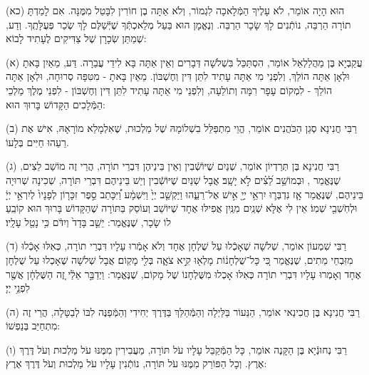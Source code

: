 \documentclass[twoside, openany, parskip=half, 11pt]{book}
\begin{document}
(כא) הוּא הָיָה אוֹמֵר, לֹא עָלֶיךָ הַמְּֿלָאכָה לִגְמוֹר, וְלֹא אַתָּה בֶן חוֹרִין לִבָּטֵל מִמֶּנָּה. אִם לָמַדְתָּ תוֹרָה הַרְבֵּה, נוֹתְֿנִים לָךְ שָׂכָר הַרְבֵּה. וְנֶאֱמָן הוּא בַּעַל מְלַאכְתְּֿךָ שֶׁיְּֿשַׁלֶּם לָךְ שְׂכַר פְּעֻלָּתֶֽךָ. וְדַע, שֶׁמַתַּן שְׂכָרָן שֶׁל צַדִּיקִים לֶעָתִיד לָבוֹא:


\kolyisroel

(א)
עֲקַבְיָא בֶּן מַהֲלַלְאֵל אוֹמֵר, הִסְתַּכֵּל בִּשְׁלֹשָׁה דְּבָרִים וְאֵין אַתָּה בָּא לִידֵי עֲבֵרָה. דַּע, מֵאַיִן בָּאתָ וּלְאָן אַתָּה הוֹלֵךְ, וְלִפְנֵי מִי אַתָּה עָתִיד לִתֵּן דִּין וְחֶשְׁבּוֹן.
מֵאַיִן בָּאתָ - מִטִּפָּה סְרוּחָה,
וּלְאָן אַתָּה הוֹלֵךְ - לִמְקוֹם עָפָר רִמָּה וְתוֹלֵעָה,
וְלִפְנֵי מִי אַתָּה עָתִיד לִתֵּן דִּין וְחֶשְׁבּוֹן - לִפְנֵי מֶלֶךְ מַלְכֵי הַמְּֿלָכִים הַקָּדוֹשׁ בָּרוּךְ הוּא:

(ב)
רַבִּי חֲנִינָא סְגַן הַכֹּהֲנִים אוֹמֵר, הֱוֵי מִתְפַּלֵּל בִשְׁלוֹמָהּ שֶׁל מַלְכוּת, שֶׁאִלְמָלֵא מוֹרָאָהּ, אִישׁ אֶת רֵעֵהוּ חַיִּים בְּלָעוֹ.

(ג)
רַבִּי חֲנִינָא בֶּן תְּרַדְיוֹן אוֹמֵר, שְׁנַיִם שֶׁיּוֹשְֿׁבִין וְאֵין בֵּינֵיהֶן דִּבְרֵי תוֹרָה, הֲרֵי זֶה מוֹשַׁב לֵצִים, שֶׁנֶּאֱמַר 
, וּבְמוֹשַׁ֥ב לֵ֝צִ֗ים לֹ֣א יָשָֽׁב׃
אֲבָל שְׁנַיִם שֶׁיּוֹשְֿׁבִין וְיֵשׁ בֵּינֵיהֶם דִּבְרֵי תּוֹרָה, שְׁכִינָה שְׁרוּיָה בֵּינֵיהֶם, שֶׁנֶּאֱמַר 
אָ֧ז נִדְבְּר֛וּ יִרְאֵ֥י יְיָ֖ אִ֣ישׁ אֶל־רֵעֵ֑הוּ וַיַּקְשֵׁ֤ב יְיָ֙ וַיִּשְׁמָ֔ע וַ֠יִּכָּתֵב סֵ֣פֶר זִכָּר֤וֹן לְפָנָיו֙ לְיִרְאֵ֣י יְיָ֔ וּלְחֹֽשְׁבֵ֖י שְׁמֽוֹ׃ אֵין לִי אֶלָּא שְׁנַֽיִם מִנַּֽיִן אֲפִילּוּ אֶחָד שֶׁיּוֹשֵׁב וְעוֹסֵק בַּתּוֹרָה שֶׁהַקָּדוֹשׁ בָּרוּךְ הוּא קוֹבֵֽעַ לוֹ שָׂכָר, שֶׁנֶּאֱמַר: 
 יֵשֵׁ֤ב בָּדָד֙ וְיִדֹּ֔ם כִּ֥י נָטַ֖ל עָלָֽיו׃

(ד)
רַבִּי שִׁמְעוֹן אוֹמֵר, שְׁלֹשָׁה שֶׁאָכְֿלוּ עַל שֻׁלְחָן אֶחָד וְלֹא אָמְֿרוּ עָלָיו דִּבְרֵי תוֹרָה, כְּאִלּוּ אָכְֿלוּ מִזִּבְחֵי מֵתִים, שֶׁנֶּאֱמַר 
 כִּ֚י כָּל־שֻׁלְחָנ֔וֹת מָלְא֖וּ קִ֣יא צֹאָ֑ה בְּלִ֖י מָקֽוֹם׃ אֲבָל שְׁלשָׁה שֶׁאָכְלוּ עַל שֻׁלְחָן אֶחָד וְאָמְרוּ עָלָיו דִּבְרֵי תוֹרָה כְּאִלּוּ אָכְלוּ מִשֻּׁלְחָנוֹ שֶׁל מָקוֹם, שֶׁנֶּאֱמַר: 
וַיְדַבֵּ֣ר אֵלַ֔י זֶ֚ה הַשֻּׁלְחָ֔ן אֲשֶׁ֖ר לִפְנֵ֥י יְיָ׃



(ה)
רַבִּי חֲנִינָא בֶּן חֲכִינַאי אוֹמֵר, הַנֵּעוֹר בַּלַּיְלָה וְהַמְּֿהַלֵּךְ בַּדֶּרֶךְ יְחִידִי וְהַמְּֿפַנֶּה לִבּוֹ לְבַטָּלָה,
הֲרֵי זֶה מִתְחַיֵּב בְּנַפְשׁוֹ:

(ו)
רַבִּי נְחוּנְֿיָא בֶּן הַקָּנֶה אוֹמֵר, כָּל הַמְּֿקַבֵּל עָלָיו עֹל תּוֹרָה, מַעֲבִירִין מִמֶּנּוּ עֹל מַלְכוּת וְעֹל דֶּרֶךְ אֶרֶץ.
וְכָל הַפּוֹרֵק מִמֶּנּוּ עֹל תּוֹרָה, נוֹתְֿנִין עָלָיו עֹל מַלְכוּת וְעֹל דֶּרֶךְ אֶרֶץ:
\end{document}
